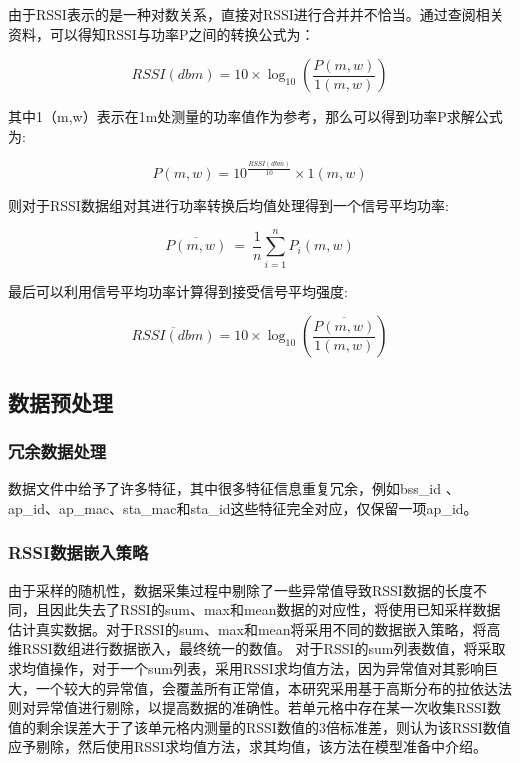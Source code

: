 \documentclass[bwprint]{gmcmthesis}
\begin{document}
由于RSSI表示的是一种对数关系，直接对RSSI进行合并并不恰当。通过查阅相关资料，可以得知RSSI与功率P之间的转换公式为：

\begin{equation}
	RSSI\left( dbm \right) =10\times \log _{10}\left( \frac{P\left( m,w \right)}{1\left( m,w \right)} \right) 
\end{equation}

其中1（m,w）表示在1m处测量的功率值作为参考，那么可以得到功率P求解公式为:

\begin{equation}
	P\left( m,w \right) =10^{\frac{RSSI\left( dbm \right)}{10}}\times 1\left( m,w \right) 
\end{equation}

则对于RSSI数据组对其进行功率转换后均值处理得到一个信号平均功率:

\begin{equation}
	\overline{P\left( m,w \right) }\ =\ \frac{1}{n}\sum_{i=1}^n{P_i\left( m,w \right)}
\end{equation}

最后可以利用信号平均功率计算得到接受信号平均强度:

\begin{equation}
	\overline{RSSI\left( dbm \right) }=10\times \log _{10}\left( \frac{\overline{P\left( m,w \right) }}{1\left( m,w \right)} \right) 
\end{equation}

\subsection{数据预处理}
\subsubsection{冗余数据处理}

数据文件中给予了许多特征，其中很多特征信息重复冗余，例如bss\_id 、 ap\_id、ap\_mac、sta\_mac和sta\_id这些特征完全对应，仅保留一项ap\_id。

\subsubsection{RSSI数据嵌入策略}

由于采样的随机性，数据采集过程中剔除了一些异常值导致RSSI数据的长度不同，且因此失去了RSSI的sum、max和mean数据的对应性，将使用已知采样数据估计真实数据。对于RSSI的sum、max和mean将采用不同的数据嵌入策略，将高维RSSI数组进行数据嵌入，最终统一的数值。
对于RSSI的sum列表数值，将采取求均值操作，对于一个sum列表，采用RSSI求均值方法，因为异常值对其影响巨大，一个较大的异常值，会覆盖所有正常值，本研究采用基于高斯分布的拉依达法则对异常值进行剔除，以提高数据的准确性。若单元格中存在某一次收集RSSI数值的剩余误差大于了该单元格内测量的RSSI数值的3倍标准差，则认为该RSSI数值应予剔除，然后使用RSSI求均值方法，求其均值，该方法在模型准备中介绍。
\end{document}
